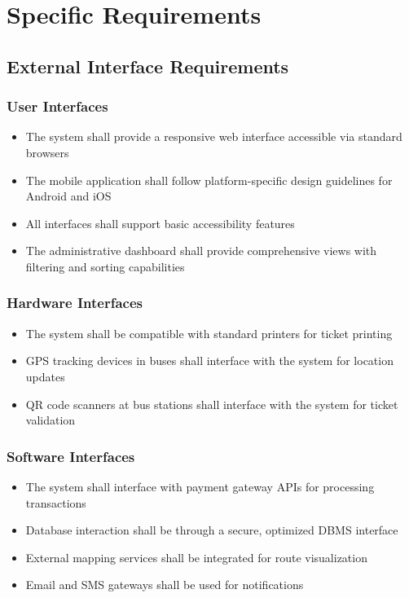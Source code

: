 \documentclass[12pt,a4paper]{report}
\begin{document}
\chapter{Specific Requirements}

\section{External Interface Requirements}

\subsection{User Interfaces}
\begin{itemize}
    \item The system shall provide a responsive web interface accessible via standard browsers
    \item The mobile application shall follow platform-specific design guidelines for Android and iOS
    \item All interfaces shall support basic accessibility features
    \item The administrative dashboard shall provide comprehensive views with filtering and sorting capabilities
\end{itemize}

\subsection{Hardware Interfaces}
\begin{itemize}
    \item The system shall be compatible with standard printers for ticket printing
    \item GPS tracking devices in buses shall interface with the system for location updates
    \item QR code scanners at bus stations shall interface with the system for ticket validation
\end{itemize}

\subsection{Software Interfaces}
\begin{itemize}
    \item The system shall interface with payment gateway APIs for processing transactions
    \item Database interaction shall be through a secure, optimized DBMS interface
    \item External mapping services shall be integrated for route visualization
    \item Email and SMS gateways shall be used for notifications
\end{itemize}
\end{document}
